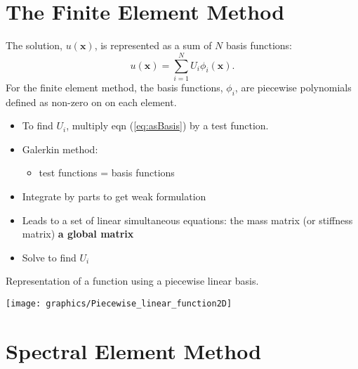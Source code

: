\begin{minipage}[c][1\totalheight][t]{0.58\columnwidth}%

\section{The Finite Element Method}

The solution, $u(\mathbf{x})$, is represented as a sum of $N$ basis
functions:
\begin{equation}
u(\mathbf{x})=\sum_{i=1}^{N}U_{i}\phi_{i}(\mathbf{x}).\label{eq:asBasis}
\end{equation}
For the finite element method, the basis functions, $\phi_{i}$, are
piecewise polynomials defined as non-zero on on each element. 
\begin{itemize}
\item To find $U_{i}$, multiply eqn (\ref{eq:asBasis}) by a test function.
\item Galerkin method:
\begin{itemize}
\item test functions = basis functions
\end{itemize}
\item Integrate by parts to get weak formulation
\item Leads to a set of linear simultaneous equations: the mass matrix (or
stiffness matrix) \textendash{} \textbf{a global matrix}
\item Solve to find $U_{i}$
\end{itemize}
%
\end{minipage}\hfill{}%
\begin{minipage}[c][1\totalheight][t]{0.38\columnwidth}%
Representation of a function using a piecewise linear basis.
\begin{center}
\texttt{[image: graphics/Piecewise\_linear\_function2D]}
\par\end{center}%
\end{minipage}

\clearpage{}

\section{Spectral Element Method }

